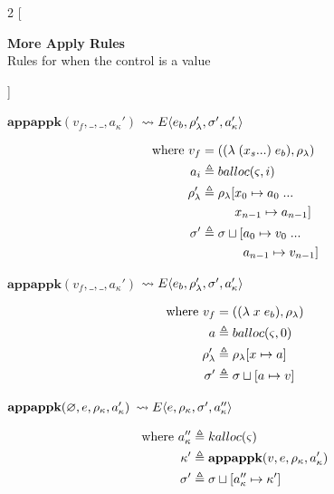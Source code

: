 \documentclass[12pt,draft]{article}
\newcommand{\lamsyn}[2]{(\lambda\;(#1 ...)\;#2)}
\newcommand{\vararglamsyn}[2]{(\lambda\;#1\;#2)}
\newcommand{\store}[0]{\sigma}
\newcommand{\kaddr}[0]{a_{\kappa}}
\newcommand{\kont}[0]{\kappa}
\newcommand{\state}[0]{\varsigma}
\newcommand{\E}[4]{E\langle #1 , #2 , #3 , #4 \rangle}
\begin{document}

\begin{multicols*}{2}
[
\begin{center}
\textbf{More Apply Rules} \\
Rules for when the control is a value
\end{center}
]
\begin{center}
  $\textbf{appappk}(v_f , \_ , \_ , \kaddr')$
  $\leadsto \E{e_b}{\lamenv'}{\store'}{\kaddr'}$
\end{center}
\vspace{-7mm}
\begin{align*}
  \text{where }
  v_f &= (\lamsyn{x_s}{e_b} , \lamenv) \\
  a_i &\triangleq balloc(\state, i) \\
  \lamenv' &\triangleq \lamenv[x_0 \mapsto a_0\;...\\
      &\;\;\;\;\;\;\;\;\;\,x_{n-1} \mapsto a_{n-1}] \\
  \store' &\triangleq \store \sqcup [a_0 \mapsto v_0\;...\\
  &\;\;\;\;\;\;\;\;\;\;\;\;a_{n-1} \mapsto v_{n-1}]
\end{align*}
\begin{center}
  $\textbf{appappk}(v_f, \_, \_, \kaddr')$
  $\leadsto \E{e_b}{\lamenv'}{\store'}{\kaddr'}$
\end{center}
\vspace{-7mm}
\begin{align*}
  \text{where }
  v_f &= (\vararglamsyn{x}{e_b}, \lamenv) \\
  a &\triangleq balloc(\state, 0) \\
  \lamenv' &\triangleq \lamenv[x \mapsto a] \\
  \store' &\triangleq \store \sqcup [a \mapsto v]
\end{align*}
\begin{center}
  $\textbf{appappk}(\varnothing, e, \kenv, \kaddr')$
  $\leadsto \E{e}{\kenv}{\store'}{\kaddr''}$
\end{center}
\vspace{-7mm}
\begin{align*}
  \text{where }
  \kaddr'' &\triangleq kalloc(\state) \\
  \kont' &\triangleq \textbf{appappk}(v, e, \kenv , \kaddr') \\
  \store' &\triangleq \store \sqcup [\kaddr'' \mapsto \kont']
\end{align*}


\end{multicols*}
\end{document}
